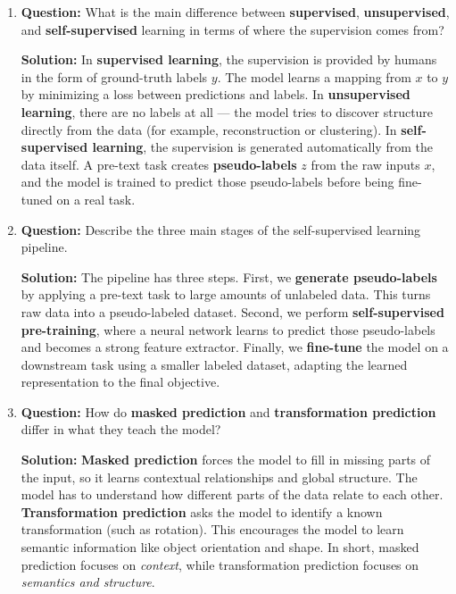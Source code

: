 \documentclass{article}
\begin{document}
\begin{enumerate}

\item \textbf{Question:} 
What is the main difference between \textbf{supervised}, \textbf{unsupervised}, and \textbf{self-supervised} learning in terms of where the supervision comes from?

\textbf{Solution:}  
In \textbf{supervised learning}, the supervision is provided by humans in the form of ground-truth labels $y$. The model learns a mapping from $x$ to $y$ by minimizing a loss between predictions and labels.  
In \textbf{unsupervised learning}, there are no labels at all — the model tries to discover structure directly from the data (for example, reconstruction or clustering).  
In \textbf{self-supervised learning}, the supervision is generated automatically from the data itself. A pre-text task creates \textbf{pseudo-labels} $z$ from the raw inputs $x$, and the model is trained to predict those pseudo-labels before being fine-tuned on a real task.

\item \textbf{Question:} 
Describe the three main stages of the self-supervised learning pipeline.

\textbf{Solution:}  
The pipeline has three steps.  
First, we \textbf{generate pseudo-labels} by applying a pre-text task to large amounts of unlabeled data. This turns raw data into a pseudo-labeled dataset.  
Second, we perform \textbf{self-supervised pre-training}, where a neural network learns to predict those pseudo-labels and becomes a strong feature extractor.  
Finally, we \textbf{fine-tune} the model on a downstream task using a smaller labeled dataset, adapting the learned representation to the final objective.

\item \textbf{Question:} 
How do \textbf{masked prediction} and \textbf{transformation prediction} differ in what they teach the model?

\textbf{Solution:}  
\textbf{Masked prediction} forces the model to fill in missing parts of the input, so it learns contextual relationships and global structure. The model has to understand how different parts of the data relate to each other.  
\textbf{Transformation prediction} asks the model to identify a known transformation (such as rotation). This encourages the model to learn semantic information like object orientation and shape.  
In short, masked prediction focuses on \emph{context}, while transformation prediction focuses on \emph{semantics and structure}.


\end{enumerate}
\end{document}

